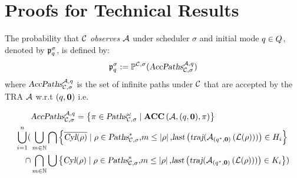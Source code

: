 \section{Proofs for Technical Results}\label{app:proof}

%         

The probability that $\mathcal{C}$ \emph{observes} $\mathcal{A}$ under scheduler $\sigma$ and initial mode $q\in Q$, denoted by $\mathfrak{p}_{q}^{\sigma}$, is defined by:
\[
    \mathfrak{p}_{q}^{\sigma}
        :=
            \mathbb{P}^{\mathcal{C},\sigma}(
                \mbox{\sl AccPaths} _{\mathcal{C},\sigma} ^{\mathcal{A},q}
            )
\]
where $\mbox{\sl AccPaths} _{\mathcal{C},\sigma} ^{\mathcal{A},q}$ is the set of infinite paths under $\mathcal{C}$ that are accepted by the TRA $\mathcal{A}$ w.r.t $(q,\mathbf{0})$ i.e.
\begin{small}
\begin{align*}
    &
    \mbox{\sl AccPaths} _{\mathcal{C},\sigma} ^{\mathcal{A},q} = 
        \left \{
            \pi \in \mbox{\sl Paths}^\omega_{\mathcal{C},\sigma} \mid
            \mbox{\bf ACC} \left( {\mathcal{A}}, {(q,\mathbf{0})}, {\pi} \right)
        \right\}
        \\
        \bigcup_{i=1}^{n} (
            &
            \bigcup_{m \in \mathbb{N}}
            \bigcap \left \{
                \overline{\mbox{\sl Cyl}(\rho)}
                \mid
                \rho \in \mbox{\sl Paths}^*_{\mathcal{C},\sigma}
                \mbox{,}
                m \le \left| \rho \right|
                \mbox{,}
                \mbox{\sl last}\left(
                    \mbox{\sl traj} ( 
                        {\mathcal{A}}_{\left(q^*,\mathbf{0}\right)}\left(\mathcal{L}(\rho)\right)
                     )
                \right) \in H_i
            \right \}
            \\
            \cap
            &
            \bigcap_{m \in \mathbb{N}}
            \bigcup \left \{
                \mbox{\sl Cyl}(\rho)
                \mid
                \rho \in \mbox{\sl Paths}^*_{\mathcal{C},\sigma}
                \mbox{,}
                m \le \left| \rho \right|
                \mbox{,}
                \mbox{\sl last}\left(
                    \mbox{\sl traj} ( 
                        {\mathcal{A}}_{\left(q^*,\mathbf{0}\right)}\left(\mathcal{L}(\rho)\right)
                     )
                \right) \in K_i
            \right \}
        )
\end{align*}
\end{small}
